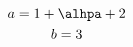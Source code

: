 \documentclass{article}
\begin{document}
\begin{gather}
a=1+\alhpa+2 \\
b=3
\end{gather}
\end{document}
